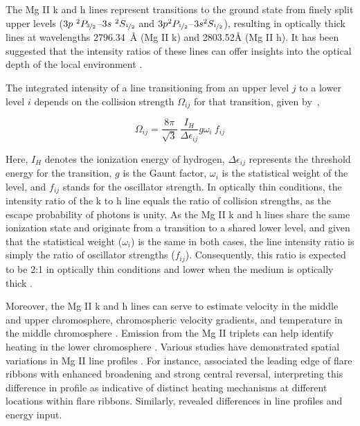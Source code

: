 The Mg II k and h lines represent transitions to the ground state from finely split upper levels ($3p~^{2}P_{\nicefrac{3}{2}}${--}$3s~^{2}S_{\nicefrac{1}{2}}$ and $3p ^{2}P_{\nicefrac{1}{2}}${--}$3s^{2}S_{\nicefrac{1}{2}}$), resulting in optically thick lines at wavelengths 2796.34~{\AA} (Mg II k) and 2803.52{\AA} (Mg II h). It has been suggested that the intensity ratios of these lines can offer insights into the optical depth of the local environment \citep{kerr15}.

The integrated intensity of a line transitioning from an upper level $j$ to a lower level $i$ depends on the collision strength $\Omega_{ij}$ for that transition, given by~\citep{henri62,mariska92},

\begin{equation*}
\Omega_{ij}=\frac{8\pi}{\sqrt{3}}~\frac{I_{H}}{\Delta \epsilon_{ij}}g\omega_{i}~f_{ij}
\end{equation*}

\noindent Here, $I_{H}$ denotes the ionization energy of hydrogen, $\Delta \epsilon_{ij}$ represents the threshold energy for the transition, $g$ is the Gaunt factor, $\omega_{i}$ is the statistical weight of the level, and $f_{ij}$ stands for the oscillator strength. In optically thin conditions, the intensity ratio of the k to h line equals the ratio of collision strengths, as the escape probability of photons is unity. As the Mg II k and h lines share the same ionization state and originate from a transition to a shared lower level, and given that the statistical weight ($\omega_{i}$) is the same in both cases, the line intensity ratio is simply the ratio of oscillator strengths ($f_{ij}$). Consequently, this ratio is expected to be 2:1 in optically thin conditions and lower when the medium is optically thick \citep{kerr15,levens19}.

Moreover, the Mg II k and h lines can serve to estimate velocity in the middle and upper chromosphere, chromospheric velocity gradients, and temperature in the middle chromosphere \citep{leenarts13a,leenarts13b,pereira13}. Emission from the Mg II triplets can help identify heating in the lower chromosphere \citep{pereira15}. Various studies have demonstrated spatial variations in Mg II line profiles \citep{dalda23,panos18}. For instance, \cite{polito23} associated the leading edge of flare ribbons with enhanced broadening and strong central reversal, interpreting this difference in profile as indicative of distinct heating mechanisms at different locations within flare ribbons. Similarly, \cite{panos21,panos21_2} revealed differences in line profiles and energy input.

